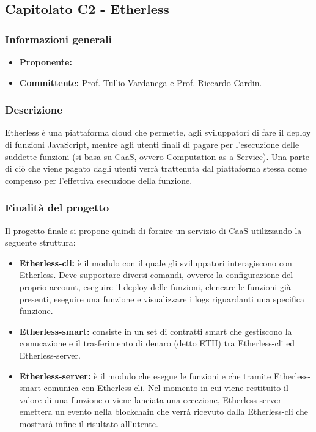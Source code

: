

    \subsection{Capitolato C2 - Etherless}
       \subsubsection{Informazioni generali}
       \begin{itemize}
           \item \textbf{Proponente: }
           \item \textbf{Committente: }Prof. Tullio Vardanega e Prof. Riccardo Cardin.
       \end{itemize}

    \subsubsection{Descrizione}
       Etherless è una piattaforma cloud che permette, agli sviluppatori di fare il deploy di funzioni JavaScript, mentre  agli utenti finali di pagare per l'esecuzione delle suddette funzioni (si basa su CaaS, ovvero Computation-as-a-Service).
       Una parte di ciò che viene pagato dagli utenti verrà trattenuta dal piattaforma stessa come compenso per l'effettiva esecuzione della funzione. 
    \subsubsection{Finalità del progetto}
     Il progetto finale si propone quindi di fornire un servizio di CaaS utilizzando la seguente struttura:
     \begin{itemize}
    		\item \textbf{Etherless-cli: }è il modulo con il quale gli sviluppatori interagiscono con Etherless. Deve supportare diversi comandi, ovvero: la configurazione del proprio account, eseguire il deploy delle funzioni, elencare le funzioni già presenti, eseguire una funzione e visualizzare i logs riguardanti una specifica funzione.
    		\item \textbf{Etherless-smart: }consiste in un set di contratti smart che gestiscono la comucazione e il trasferimento di denaro (detto ETH) tra Etherless-cli ed Etherless-server.
    		\item \textbf{Etherless-server: }è il modulo che esegue le funzioni e che tramite Etherless-smart comunica con Etherless-cli.  Nel momento in cui viene restituito il valore di una funzione o viene lanciata una eccezione, Etherless-server  emettera un evento nella blockchain che verrà ricevuto dalla Etherless-cli che mostrarà infine il risultato all'utente. 
	\end{itemize}      
